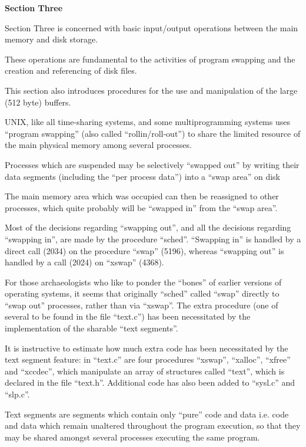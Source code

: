 %
%
{\noindent \Large \bf Section Three}

{\noindent \sf Section Three
is concerned with basic
input/output operations between the
main memory and disk storage.

These operations are fundamental to the
activities of program swapping and the
creation and referencing of disk files.

This section also introduces procedures
for the use and manipulation of the
large (512 byte) buffers.
}


UNIX, like all time-sharing systems,
and some multiprogramming systems uses
``program swapping'' (also called ``rollin/roll-out'')
 to share the limited
resource of the main physical memory
among several processes.

Processes which are suspended may be
selectively ``swapped out'' by writing
their data segments (including the ``per
process data'') into a ``swap area'' on
disk

The main memory area which was occupied
can then be reassigned to other
processes, which quite probably will be
``swapped in'' from the ``swap area''.

Most of the decisions regarding ``swapping out'', and all the decisions
regarding ``swapping in'', are made by
the procedure ``sched''. ``Swapping in'' is
handled by a direct call (2034) on the
procedure ``swap'' (5196), whereas ``swapping out'' is handled by a call (2024)
on ``xswap'' (4368).

For those archaeologists who like to
ponder the ``bones'' of earlier versions
of operating systems, it seems that
originally ``sched'' called ``swap''
directly to ``swap out'' processes,
rather than via ``xswap''. The extra procedure (one of several to be found in
the file ``text.c'') has been necessitated by the implementation of the
sharable ``text segments''.

It is instructive to estimate how much
extra code has been necessitated by the
text segment feature: in ``text.c'' are
four procedures ``xswap'', ``xalloc'',
``xfree'' and ``xccdec'', which manipulate
an array of structures called ``text'',
which is declared in the file ``text.h''.
Additional code has also been added to
``sysl.c'' and ``slp.c''.



Text segments are segments which contain only ``pure'' code and data i.e.
code and data which remain unaltered
throughout the program execution, so
that they may be shared amongst several
processes executing the same program.

